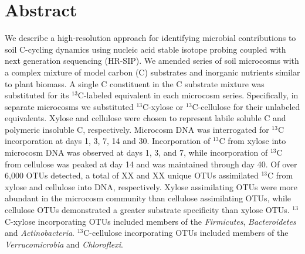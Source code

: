 \section{Abstract}
We describe a high-resolution approach for identifying microbial contributions
to soil C-cycling dynamics using nucleic acid stable isotope probing coupled
with next generation sequencing (HR-SIP). We amended series of soil microcosms
with a complex mixture of model carbon (C) substrates and inorganic nutrients
similar to plant biomass. A single C constituent in the C substrate mixture was
substituted for its $^{13}$C-labeled equivalent in each microcosm series.
Specifically, in separate microcosms we substituted $^{13}$C-xylose or
$^{13}$C-cellulose for their unlabeled equivalents. Xylose and cellulose were
chosen to represent labile soluble C and polymeric insoluble C, respectively.
Microcosm DNA was interrogated for $^{13}$C incorporation at days 1, 3, 7, 14 and 
30. Incorporation of $^{13}$C from xylose into microcosm DNA
was observed at days 1, 3, and 7, while incorporation of $^{13}$C from
cellulose was peaked at day 14 and was maintained through day 40. Of over 6,000
OTUs detected, a total of XX and XX unique OTUs assimilated $^{13}$C from
xylose and cellulose into DNA, respectively. Xylose assimilating OTUs were more
abundant in the microcosm community than cellulose assimilating OTUs, while
cellulose OTUs demonstrated a greater substrate specificity than xylose OTUs.
$^{13}$C-xylose incorporating OTUs included members of the \textit{Firmicutes},
\textit{Bacteroidetes} and \textit{Actinobacteria}. $^{13}$C-cellulose
incorporating OTUs included members of the \textit{Verrucomicrobia} and
\textit{Chloroflexi}.  

